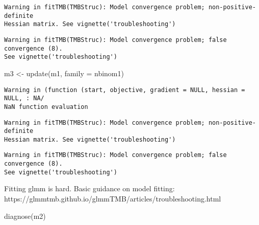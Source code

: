 \documentclass[
  letterpaper,
  DIV=11,
  numbers=noendperiod]{scrreprt}
\newenvironment{Shaded}{\begin{snugshade}}{\end{snugshade}}
\newcommand{\AttributeTok}[1]{\textcolor[rgb]{0.40,0.45,0.13}{#1}}
\newcommand{\FunctionTok}[1]{\textcolor[rgb]{0.28,0.35,0.67}{#1}}
\newcommand{\NormalTok}[1]{\textcolor[rgb]{0.00,0.23,0.31}{#1}}
\newcommand{\OtherTok}[1]{\textcolor[rgb]{0.00,0.23,0.31}{#1}}
\begin{document}
\begin{verbatim}
Warning in fitTMB(TMBStruc): Model convergence problem; non-positive-definite
Hessian matrix. See vignette('troubleshooting')
\end{verbatim}

\begin{verbatim}
Warning in fitTMB(TMBStruc): Model convergence problem; false convergence (8).
See vignette('troubleshooting')
\end{verbatim}

\begin{Shaded}
\begin{Highlighting}[]
\NormalTok{m3 }\OtherTok{\textless{}{-}} \FunctionTok{update}\NormalTok{(m1, }\AttributeTok{family =}\NormalTok{ nbinom1)}
\end{Highlighting}
\end{Shaded}

\begin{verbatim}
Warning in (function (start, objective, gradient = NULL, hessian = NULL, : NA/
NaN function evaluation
\end{verbatim}

\begin{verbatim}
Warning in fitTMB(TMBStruc): Model convergence problem; non-positive-definite
Hessian matrix. See vignette('troubleshooting')
\end{verbatim}

\begin{verbatim}
Warning in fitTMB(TMBStruc): Model convergence problem; false convergence (8).
See vignette('troubleshooting')
\end{verbatim}

Fitting glmm is hard. Basic guidance on model fitting:
https://glmmtmb.github.io/glmmTMB/articles/troubleshooting.html

\begin{Shaded}
\begin{Highlighting}[]
\FunctionTok{diagnose}\NormalTok{(m2)}
\end{Highlighting}
\end{Shaded}
\end{document}
